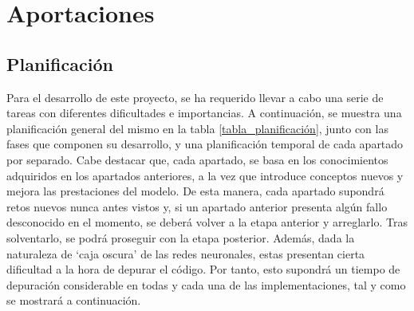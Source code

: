 \chapter{Aportaciones}

\section{Planificación}

Para el desarrollo de este proyecto, se ha requerido llevar a cabo una serie de tareas con diferentes dificultades e importancias. A continuación, se muestra una planificación general del mismo en la tabla \ref{tabla_planificación}, junto con las fases que componen su desarrollo, y una planificación temporal de cada apartado por separado. Cabe destacar que, cada apartado, se basa en los conocimientos adquiridos en los apartados anteriores, a la vez que introduce conceptos nuevos y mejora las prestaciones del modelo. De esta manera, cada apartado supondrá retos nuevos nunca antes vistos y, si un apartado anterior presenta algún fallo desconocido en el momento, se deberá volver a la etapa anterior y arreglarlo. Tras solventarlo, se podrá proseguir con la etapa posterior. Además, dada la naturaleza de `caja oscura' de las redes neuronales, estas presentan cierta dificultad a la hora de depurar el código. Por tanto, esto supondrá un tiempo de depuración considerable en todas y cada una de las implementaciones, tal y como se mostrará a continuación.

